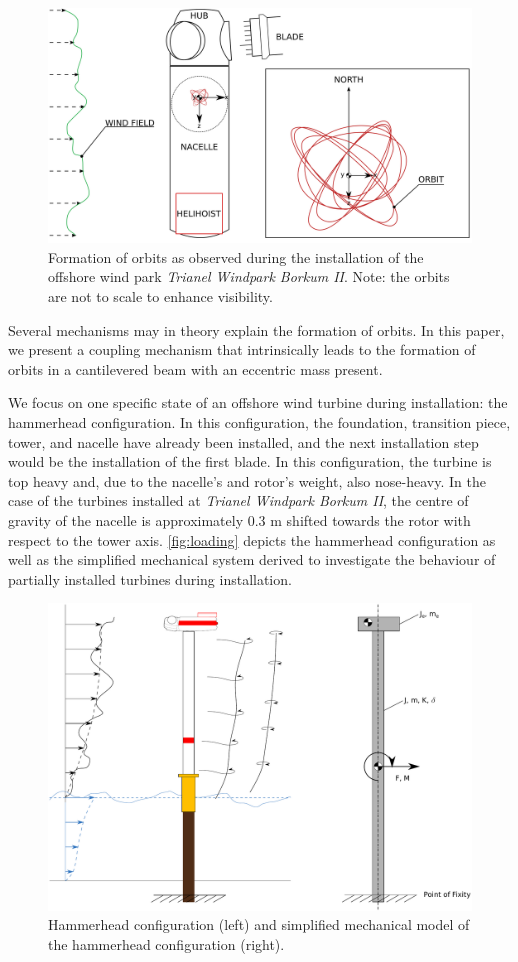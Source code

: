 \documentclass{article}
\begin{document}
\begin{figure}[ht!]
    \centering
    \includegraphics[width=0.7\linewidth]{figures/installation_alt2.png}
    \caption{Formation of orbits as observed during the installation of the offshore wind park \textit{Trianel Windpark Borkum II}. Note: the orbits are not to scale to enhance visibility.}
    \label{fig:orbit}
\end{figure}

Several mechanisms may in theory explain the formation of orbits. In this paper, we present a coupling mechanism that intrinsically leads to the formation of orbits in a cantilevered beam with an eccentric mass present. 

We focus on one specific state of an offshore wind turbine during installation: the hammerhead configuration. In this configuration, the foundation, transition piece, tower, and nacelle have already been installed, and the next installation step would be the installation of the first blade. In this configuration, the turbine is top heavy and, due to the nacelle's and rotor's weight, also nose-heavy. In the case of the turbines installed at \textit{Trianel Windpark Borkum II}, the centre of gravity of the nacelle is approximately 0.3 m shifted towards the rotor with respect to the tower axis. \autoref{fig:loading} depicts the hammerhead configuration as well as the simplified mechanical system derived to investigate the behaviour of partially installed turbines during installation. 

\begin{figure}[ht!]
    \centering
    \includegraphics[width=0.7\linewidth]{figures/loading_3.pdf}
    \caption{Hammerhead configuration (left) and simplified mechanical model of the hammerhead configuration (right).}
    \label{fig:loading}
\end{figure}
\end{document}
